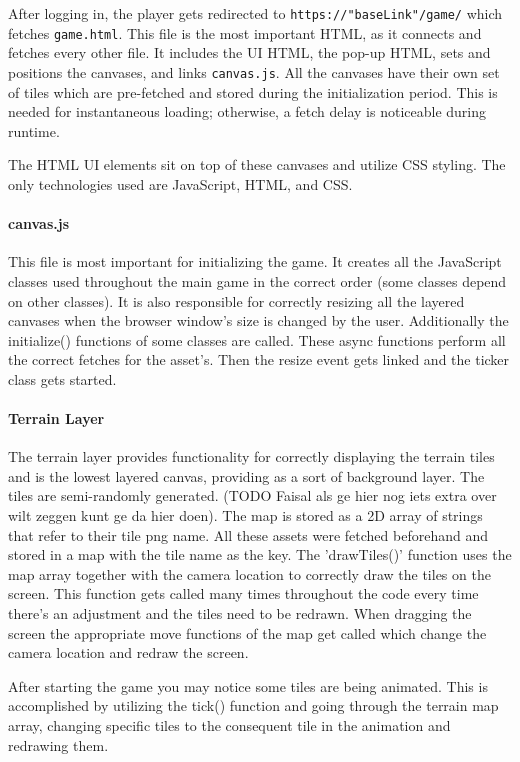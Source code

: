 \documentclass[12pt]{article}
\begin{document}
After logging in, the player gets redirected to \texttt{https://"baseLink"/game/} which fetches \texttt{game.html}. This
file is the most important HTML, as it connects and fetches every other file. It includes the UI HTML, the pop-up HTML,
sets and positions the canvases, and links \texttt{canvas.js}. All the canvases have their own set of tiles which are
pre-fetched and stored during the initialization period. This is needed for instantaneous loading; otherwise, a fetch
delay is noticeable during runtime.

The HTML UI elements sit on top of these canvases and utilize CSS styling. The only technologies used are JavaScript,
HTML, and CSS.


\paragraph{canvas.js} This file is most important for initializing the game. It creates all the JavaScript classes used
throughout the main game in the correct order (some classes depend on other classes). It is also responsible for
correctly resizing all the layered canvases when the browser window's size is changed by the user. Additionally the
initialize() functions of some classes are called. These async functions perform all the correct fetches for the
asset's. Then the resize event gets linked and the ticker class gets started.

\paragraph{Terrain Layer}
The terrain layer provides functionality for correctly displaying the terrain tiles and is the lowest layered canvas,
providing as a sort of background layer. The tiles are semi-randomly generated. (TODO Faisal als ge hier nog iets extra
over wilt zeggen kunt ge da hier doen). The map is stored as a 2D array of strings that refer to their tile png name.
All these assets were fetched beforehand and stored in a map with the tile name as the key. The 'drawTiles()' function
uses the map array together with the camera location to correctly draw the tiles on the screen. This function gets
called many times throughout the code every time there's an adjustment and the tiles need to be redrawn. When dragging
the screen the appropriate move functions of the map get called which change the camera location and redraw the screen.

After starting the game you may notice some tiles are being animated. This is accomplished by utilizing the tick()
function and going through the terrain map array, changing specific tiles to the consequent tile in the animation and
redrawing them.
\end{document}
